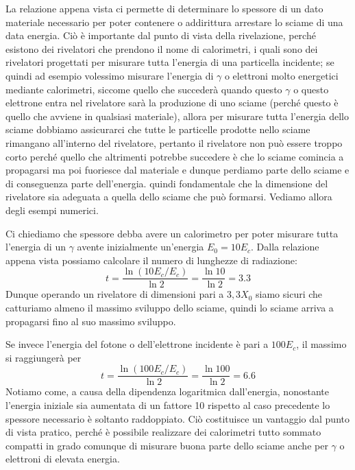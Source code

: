 \begin{esempio}
    La relazione appena vista ci permette di determinare lo spessore di un dato materiale necessario per poter contenere o addirittura arrestare lo sciame di una data energia. Ciò è importante dal punto di vista della rivelazione, perché esistono dei rivelatori che prendono il nome di calorimetri, i quali sono dei rivelatori progettati per misurare tutta l'energia di una particella incidente; se quindi ad esempio volessimo misurare l'energia di $\gamma$ o elettroni molto energetici mediante calorimetri, siccome quello che succederà quando questo $\gamma$ o questo elettrone entra nel rivelatore sarà la produzione di uno sciame (perché questo è quello che avviene in qualsiasi materiale), allora per misurare tutta l'energia dello sciame dobbiamo assicurarci che tutte le particelle prodotte nello sciame rimangano all'interno del rivelatore, pertanto il rivelatore non può essere troppo corto perché quello che altrimenti potrebbe succedere è che lo sciame comincia a propagarsi ma poi fuoriesce dal materiale e dunque perdiamo parte dello sciame e di conseguenza parte dell'energia. \E quindi fondamentale che la dimensione del rivelatore sia adeguata a quella dello sciame che può formarsi. Vediamo allora degli esempi numerici.

    Ci chiediamo che spessore debba avere un calorimetro per poter misurare tutta l'energia di un $\gamma$ avente inizialmente un'energia $E_0=10E_c$. Dalla relazione appena vista possiamo calcolare il numero di lunghezze di radiazione:
    \begin{equation*}
        t=\frac{\ln (10E_c/E_c)}{\ln 2}=\frac{\ln 10}{\ln 2}=3.3
    \end{equation*}
    Dunque operando un rivelatore di dimensioni pari a $3,3X_0$ siamo sicuri che catturiamo almeno il massimo sviluppo dello sciame, quindi lo sciame arriva a propagarsi fino al suo massimo sviluppo\footnotemark.

    Se invece l'energia del fotone o dell'elettrone incidente è pari a $100E_c$, il massimo si raggiungerà per
    \begin{equation*}
        t=\frac{\ln (100E_c/E_c)}{\ln 2}=\frac{\ln 100}{\ln 2}=6.6
    \end{equation*}
    Notiamo come, a causa della dipendenza logaritmica dall'energia, nonostante l'energia iniziale sia aumentata di un fattore 10 rispetto al caso precedente lo spessore necessario è soltanto raddoppiato. Ciò costituisce un vantaggio dal punto di vista pratico, perché è possibile realizzare dei calorimetri tutto sommato compatti in grado comunque di misurare buona parte dello sciame anche per $\gamma$ o elettroni di elevata energia.
\end{esempio}

